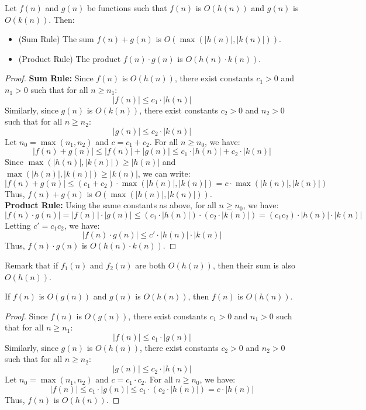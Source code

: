 \begin{theorem}
    Let $f(n)$ and $g(n)$ be functions such that $f(n)$ is $O(h(n))$ and $g(n)$ is $O(k(n))$. Then:
    \begin{itemize}[itemsep=1pt,label=$\circ$]
        \item (Sum Rule) The sum $f(n) + g(n)$ is $O(\max(|h(n)|, |k(n)|))$.
        \item (Product Rule) The product $f(n) \cdot g(n)$ is $O(h(n) \cdot k(n))$.
    \end{itemize}
\end{theorem}
\begin{proof}
    \textbf{Sum Rule:} Since $f(n)$ is $O(h(n))$, there exist constants $c_1 > 0$ and $n_1 > 0$ such that for all $n \geq n_1$:
    \[|f(n)| \leq c_1 \cdot |h(n)|\]
    Similarly, since $g(n)$ is $O(k(n))$, there exist constants $c_2 > 0$ and $n_2 > 0$ such that for all $n \geq n_2$:
    \[|g(n)| \leq c_2 \cdot |k(n)|\]
    Let $n_0 = \max(n_1, n_2)$ and $c = c_1 + c_2$. For all $n \geq n_0$, we have:
    \[|f(n) + g(n)| \leq |f(n)| + |g(n)| \leq c_1 \cdot |h(n)| + c_2 \cdot |k(n)|\]
    Since $\max(|h(n)|, |k(n)|) \geq |h(n)|$ and $\max(|h(n)|, |k(n)|) \geq |k(n)|$, we can write:
    \[|f(n) + g(n)| \leq (c_1 + c_2) \cdot \max(|h(n)|, |k(n)|) = c \cdot \max(|h(n)|, |k(n)|)\]
    Thus, $f(n) + g(n)$ is $O(\max(|h(n)|, |k(n)|))$. \\
    \textbf{Product Rule:} Using the same constants as above, for all $n \geq n_0$, we have:
    \[|f(n) \cdot g(n)| = |f(n)| \cdot |g(n)| \leq (c_1 \cdot |h(n)|) \cdot (c_2 \cdot |k(n)|) = (c_1 c_2) \cdot |h(n)| \cdot |k(n)|\]
    Letting $c' = c_1 c_2$, we have:
    \[|f(n) \cdot g(n)| \leq c' \cdot |h(n)| \cdot |k(n)|\]
    Thus, $f(n) \cdot g(n)$ is $O(h(n) \cdot k(n))$.
\end{proof}
Remark that if $f_1(n)$ and $f_2(n)$ are both $O(h(n))$, then their sum is also $O(h(n))$.

\begin{theorem}
    If $f(n)$ is $O(g(n))$ and $g(n)$ is $O(h(n))$, then $f(n)$ is $O(h(n))$.
\end{theorem}
\begin{proof}
    Since $f(n)$ is $O(g(n))$, there exist constants $c_1 > 0$ and $n_1 > 0$ such that for all $n \geq n_1$:
    \[|f(n)| \leq c_1 \cdot |g(n)|\]
    Similarly, since $g(n)$ is $O(h(n))$, there exist constants $c_2 > 0$ and $n_2 > 0$ such that for all $n \geq n_2$:
    \[|g(n)| \leq c_2 \cdot |h(n)|\]
    Let $n_0 = \max(n_1, n_2)$ and $c = c_1 \cdot c_2$. For all $n \geq n_0$, we have:
    \[|f(n)| \leq c_1 \cdot |g(n)| \leq c_1 \cdot (c_2 \cdot |h(n)|) = c \cdot |h(n)|\]
    Thus, $f(n)$ is $O(h(n))$.
\end{proof}


